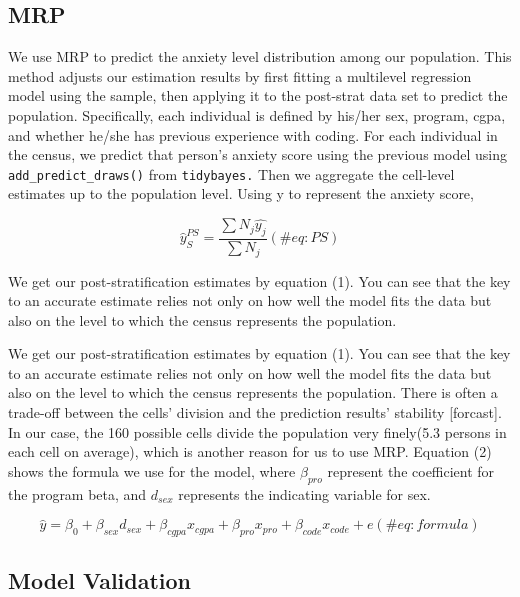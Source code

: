 \documentclass[
]{article}
\begin{document}
\hypertarget{mrp}{%
\subsection{MRP}\label{mrp}}

We use MRP to predict the anxiety level distribution among our
population. This method adjusts our estimation results by first fitting
a multilevel regression model using the sample, then applying it to the
post-strat data set to predict the population. Specifically, each
individual is defined by his/her sex, program, cgpa, and whether he/she
has previous experience with coding. For each individual in the census,
we predict that person's anxiety score using the previous model using
\texttt{add\_predict\_draws()} from \texttt{tidybayes.} Then we
aggregate the cell-level estimates up to the population level. Using y
to represent the anxiety score,

\begin{equation}
\hat{y}_S^{PS} = \frac{\sum{N_j\hat{y_j}}}{\sum{N_j}}  (\#eq:PS)
\end{equation}

We get our post-stratification estimates by equation (1). You can see
that the key to an accurate estimate relies not only on how well the
model fits the data but also on the level to which the census represents
the population.

We get our post-stratification estimates by equation (1). You can see
that the key to an accurate estimate relies not only on how well the
model fits the data but also on the level to which the census represents
the population. There is often a trade-off between the cells' division
and the prediction results' stability {[}forcast{]}. In our case, the
160 possible cells divide the population very finely(5.3 persons in each
cell on average), which is another reason for us to use MRP. Equation
(2) shows the formula we use for the model, where \(\beta_{pro}\)
represent the coefficient for the program beta, and \(d_{sex}\)
represents the indicating variable for sex.

\begin{equation}
\hat{y} = \beta_0 + \beta_{sex}d_{sex} + \beta_{cgpa}x_{cgpa} + \beta_{pro}x_{pro} + \beta_{code}x_{code} + e (\#eq:formula)
\end{equation}

\hypertarget{model-validation}{%
\subsection{Model Validation}\label{model-validation}}
\end{document}
